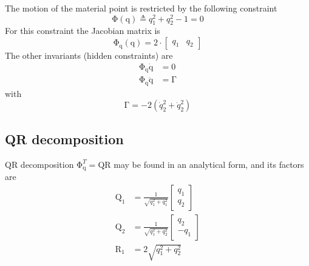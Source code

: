 \documentclass{scrartcl}
\newcommand\mMat[1]{\ensuremath{\boldsymbol{\mathrm{#1}}}}
\newcommand\mVec[1]{\ensuremath{\boldsymbol{\mathrm{#1}}}}
\newcommand\mOf[1]{\left({#1}\right)}
\begin{document}
The motion of the material point is restricted by the following constraint
\begin{equation}
  \mMat{\Phi}\mOf{\mVec{q}} \triangleq q_1^2 + q_2^2 - 1 = 0
  \label{eq:90ZU7}
\end{equation}
For this constraint the Jacobian matrix is
\begin{equation}
  \mMat{\Phi}_{\mVec{q}}\mOf{\mVec{q}} = 2 \cdot \begin{bmatrix}
    q_1 & q_2
  \end{bmatrix}
  \label{eq:5L0HL}
\end{equation}
The other invariants (hidden constraints) are
\begin{subequations}
\label{eq:IQT3I}
\begin{align}
  \mMat{\Phi}_{\mVec{q}}\mVec{\dot q} &= \mVec{0}
  \\
  \mMat{\Phi}_{\mVec{q}}\mVec{\ddot q} &= \mVec{\Gamma}
\end{align}
\end{subequations}
with
\begin{equation}
  \mVec{\Gamma} = - 2 \left( {\dot q}_2^2 + {\dot q}_2^2 \right)
\end{equation}

\subsection{QR decomposition}

QR decomposition $\mMat{\Phi}_{\mVec{q}}^T = \mMat{Q} \mMat{R}$ may be found in
an analytical form, and its factors are
\begin{subequations}
\begin{align}
  \mMat{Q}_1 & = \frac{1}{\sqrt{q_1^2 + q_1^2}} \begin{bmatrix}
    q_1 \\ q_2
  \end{bmatrix}
  \\
  \mMat{Q}_2 & = \frac{1}{\sqrt{q_1^2 + q_2^2}} \begin{bmatrix}
    q_2 \\ -q_1
  \end{bmatrix}
  \\
  \mMat{R}_1 & = 2 \sqrt{q_1^2 + q_2^2}
\end{align}
\end{subequations}
\end{document}
